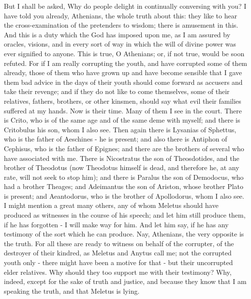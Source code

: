 But I shall be asked, Why do people delight in continually conversing
with you? I have told you already, Athenians, the whole truth about
this: they like to hear the cross-examination of the pretenders to
wisdom; there is amusement in this. And this is a duty which the God
has imposed upon me, as I am assured by oracles, visions, and in every
sort of way in which the will of divine power was ever signified to
anyone. This is true, O Athenians; or, if not true, would be soon
refuted. For if I am really corrupting the youth, and have corrupted
some of them already, those of them who have grown up and have become
sensible that I gave them bad advice in the days of their youth should
come forward as accusers and take their revenge; and if they do not
like to come themselves, some of their relatives, fathers, brothers,
or other kinsmen, should say what evil their families suffered at
my hands. Now is their time. Many of them I see in the court. There
is Crito, who is of the same age and of the same deme with myself;
and there is Critobulus his son, whom I also see. Then again there
is Lysanias of Sphettus, who is the father of Aeschines - he is present;
and also there is Antiphon of Cephisus, who is the father of Epignes;
and there are the brothers of several who have associated with me.
There is Nicostratus the son of Theosdotides, and the brother of Theodotus
(now Theodotus himself is dead, and therefore he, at any rate, will
not seek to stop him); and there is Paralus the son of Demodocus,
who had a brother Theages; and Adeimantus the son of Ariston, whose
brother Plato is present; and Aeantodorus, who is the brother of Apollodorus,
whom I also see. I might mention a great many others, any of whom
Meletus should have produced as witnesses in the course of his speech;
and let him still produce them, if he has forgotten - I will make
way for him. And let him say, if he has any testimony of the sort
which he can produce. Nay, Athenians, the very opposite is the truth.
For all these are ready to witness on behalf of the corrupter, of
the destroyer of their kindred, as Meletus and Anytus call me; not
the corrupted youth only - there might have been a motive for that
- but their uncorrupted elder relatives. Why should they too support
me with their testimony? Why, indeed, except for the sake of truth
and justice, and because they know that I am speaking the truth, and
that Meletus is lying. 

